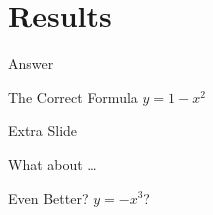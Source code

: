 \documentclass[17pt,serif,mathsans]{beamer}
\begin{document}
\section{Results}


\begin{frame}{Answer}
  \begin{center}
    \begin{block}{The Correct Formula}
      $y = 1-x^2$
    \end{block}
  \end{center}
\end{frame}

\rgmbeamerhidesections


\rgmbeamerextraslides

\begin{frame}{Extra Slide}
  \begin{center}
  What about \ldots

  \begin{exampleblock}{Even Better?}
    $y = -x^3$?
  \end{exampleblock}
  \end{center}
\end{frame}

\rgmbeamerendcontent
\end{document}
